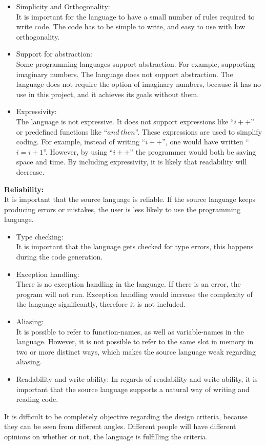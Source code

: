 \begin{itemize}
\item Simplicity and Orthogonality: \\
It is important for the language to have a small number of rules required to write code. The code has to be simple to write, and easy to use with low orthogonality.
\item Support for abstraction: \\
Some programming languages support abstraction. For example, supporting imaginary numbers. The language does not support abstraction. The language does not require the option of imaginary numbers, because it has no use in this project, and it achieves its goals without them.
\item Expressivity: \\
The language is not expressive. It does not support expressions like ``$i++$'' or predefined functions like ``$and~then$''. These expressions are used to simplify coding. For example, instead of writing ``$i++$'', one would have written ``$i = i + 1$''. However, by using ``$i++$'' the programmer would both be saving space and time. By including expressivity, it is likely that readability will decrease. 
\end{itemize}
\textbf{Reliability:} \\
It is important that the source language is reliable. If the source language keeps producing errors or mistakes, the user is less likely to use the programming language.
\begin{itemize}
\item Type checking: \\
It is important that the language gets checked for type errors, this happens during the code generation.
\item Exception handling: \\
There is no exception handling in the language. If there is an error, the program will not run. Exception handling would increase the complexity of the language significantly, therefore it is not included.
\item Aliasing: \\
It is possible to refer to function-names, as well as variable-names in the language. However, it is not possible to refer to the same slot in memory in two or more distinct ways, which makes the source language weak regarding aliasing. 
\item Readability and write-ability:
In regards of readability and write-ability, it is important that the source language supports a natural way of writing and reading code. 
\end{itemize}
It is difficult to be completely objective regarding the design criteria, because they can be seen from different angles. Different people will have different opinions on whether or not, the language is fulfilling the criteria. 